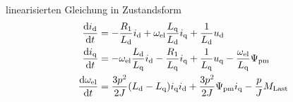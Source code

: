 \begin{shaded}
	linearisierten Gleichung in Zustandsform
\begin{align}
\frac{\mathrm{d}i_{\mathrm{d}}}{\mathrm{d}t} &= -\frac{R_{\mathrm{1}}}{L_{\mathrm{d}}}i_{\mathrm{d}}+\omega_{\mathrm{el}}\frac{L_{\mathrm{q}}}{L_{\mathrm{d}}}i_{\mathrm{q}}+\frac{1}{L_{\mathrm{d}}}u_{\mathrm{d}} \label{eqn:id_dt} \\
\frac{\mathrm{d}i_{\mathrm{q}}}{\mathrm{d}t} &= -\omega_{\mathrm{el}}\frac{L_{\mathrm{d}}}{L_{\mathrm{q}}}i_{\mathrm{d}} - \frac{R_{\mathrm{1}}}{L_{\mathrm{q}}}i_{\mathrm{q}} + \frac{1}{L_{\mathrm{q}}}u_{\mathrm{q}} - \frac{\omega_{\mathrm{el}}}{L_{\mathrm{q}}}\Psi_{\mathrm{pm}} \label{eqn:iq_dt} \\
\frac{\mathrm{d}\omega_{\mathrm{el}}}{\mathrm{d}t} &= \frac{3p^2}{2J}(L_{\mathrm{d}} - L_{\mathrm{q}})i_{\mathrm{q}} i_{\mathrm{d}} + \frac{3p^2}{2J} \Psi_{\mathrm{pm}} i_{\mathrm{q}} - \frac{p}{J} M_{\mathrm{Last}} \label{eqn:w_dt}
\end{align}
\end{shaded}


